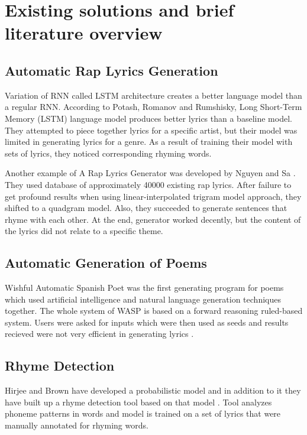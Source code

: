 \documentclass[conference]{IEEEtran}
\begin{document}
\section{Existing solutions and brief literature overview}

\subsection{Automatic Rap Lyrics Generation}
Variation of RNN called LSTM architecture creates a better language model than a regular RNN. \cite{b1}
According to Potash, Romanov and Rumshisky, Long Short-Term Memory (LSTM) language model
produces better lyrics than a baseline model. They attempted to piece together lyrics for a specific artist, but
their model was limited in generating lyrics for a genre. As a result of training their model with sets of lyrics, they
noticed corresponding rhyming words. \vspace{2.5mm}

Another example of A Rap Lyrics Generator was developed by Nguyen and Sa \cite{b2}.
They used database of approximately 40000 existing rap lyrics. After failure to get profound results when using 
linear-interpolated trigram model approach, they shifted to a quadgram model. Also, they succeeded to generate sentences 
that rhyme with each other. At the end, generator worked decently, but the content of the lyrics did not relate to a specific theme.

\subsection{Automatic Generation of Poems}
Wishful Automatic Spanish Poet was the first generating program for poems which used artificial intelligence and natural language
generation techniques together. The whole system of WASP is based on a forward reasoning ruled-based system.
Users were asked for inputs which were then used as seeds and results recieved were not very efficient in generating lyrics \cite{b3}.

\subsection{Rhyme Detection}
Hirjee and Brown have developed a probabilistic model and in addition to it they have built up a rhyme detection tool based on that model \cite{b4} \cite{b5}.
Tool analyzes phoneme patterns in words and model is trained on a set of lyrics that were manually annotated for rhyming words.
\end{document}
